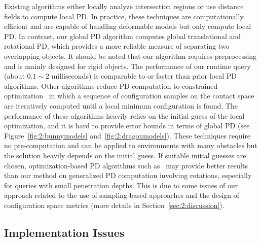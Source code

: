 Existing algorithms either locally analyze intersection regions or use distance fields to compute local PD. In practice, these techniques are computationally efficient and are capable of handling deformable models but only compute local PD. In contrast, our global PD algorithm computes global translational and rotational PD, which provides a more reliable measure of separating two overlapping objects. It should be noted that our algorithm requires preprocessing and is mainly designed for rigid objects. The performance of our runtime query (about $0.1\sim2$ milliseconds) is comparable to or faster than prior local PD algorithms. Other algorithms reduce PD computation to constrained optimization~\cite{Nawratil:2009:GPD,Zhang:2007:AFP,Je:2012:PRP,Tang:IGP:2013} in which a sequence of configuration samples on the contact space are iteratively computed until a local minimum configuration is found. The performance of these algorithms heavily relies on the initial guess of the local optimization, and it is hard to provide error bounds in terms of global PD (see Figure~\ref{fig:2:bunnymodels} and~\ref{fig:2:dragonmodels}). These techniques require no pre-computation and can be applied to environments with many obstacles but the solution heavily depends on the initial guess. If suitable initial guesses are chosen, optimization-based PD algorithms such as~\cite{Tang:IGP:2013} may provide better results than our method on generalized PD computation involving rotations, especially for queries with small penetration depths. This is due to some issues of our approach related to the use of sampling-based approaches and the design of configuration space metrics (more details in Section~\ref{sec:2:discussion}).

\subsection{Implementation Issues}

